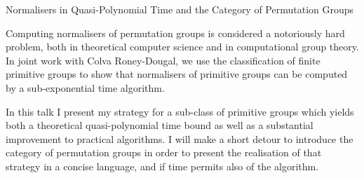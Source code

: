 Normalisers in Quasi-Polynomial Time and the Category of Permutation Groups

Computing normalisers of permutation groups is considered a
notoriously hard problem, both in theoretical computer science and in
computational group theory.
In joint work with Colva Roney-Dougal, we use the classification of
finite primitive groups to show that normalisers of primitive groups
can be computed by a sub-exponential time algorithm.

In this talk I present my strategy for a sub-class of primitive
groups which yields both a theoretical quasi-polynomial time bound as
well as a substantial improvement to practical algorithms.
I will make a short detour to introduce the category of permutation
groups in order to present the realisation of that strategy in a
concise language, and if time permits also of the algorithm.
